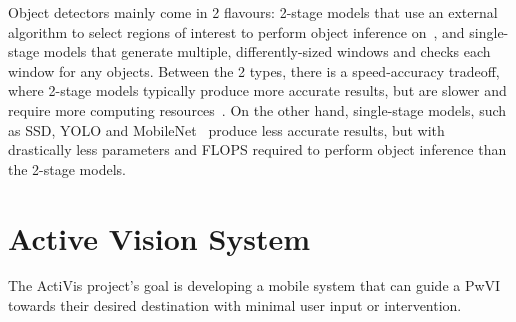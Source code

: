 \documentclass[runningheads]{llncs}
\begin{document}
Object detectors mainly come in 2 flavours: 2-stage models that use an external algorithm to select regions of interest to perform object inference on~\cite{ren2015faster}, and single-stage models that generate multiple, differently-sized windows and checks each window for any objects.
Between the 2 types, there is a speed-accuracy tradeoff, where 2-stage models typically produce more accurate results, but are slower and require more computing resources~\cite{liu2018deeplf}.
On the other hand, single-stage models, such as SSD, YOLO and MobileNet~\cite{liu2016ssd,redmon2018yolo,howard2017mobilenet} produce less accurate results, but with drastically less parameters and FLOPS required to perform object inference than the 2-stage models. 

\section{Active Vision System}\label{sec:active-vision}

The ActiVis project's goal is developing a mobile system that can guide a PwVI towards their desired destination with minimal user input or intervention. 
\end{document}
